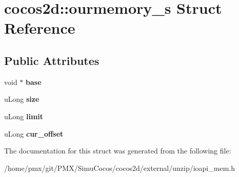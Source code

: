 \hypertarget{structcocos2d_1_1ourmemory__s}{}\section{cocos2d\+:\+:ourmemory\+\_\+s Struct Reference}
\label{structcocos2d_1_1ourmemory__s}
\subsection*{Public Attributes}
\begin{DoxyCompactItemize}
\item 
\mbox{\label{structcocos2d_1_1ourmemory__s_a734476c7b0f0e88657cf8b66eed703e2}} 
void $\ast$ {\bfseries base}
\item 
\mbox{\label{structcocos2d_1_1ourmemory__s_a7e81eabfc3e1fe169d6bd63074f669ca}} 
u\+Long {\bfseries size}
\item 
\mbox{\label{structcocos2d_1_1ourmemory__s_aead9f0a11945a09c08e53de6ea973962}} 
u\+Long {\bfseries limit}
\item 
\mbox{\label{structcocos2d_1_1ourmemory__s_a1f7478ff05fed75458bc3d623200db6d}} 
u\+Long {\bfseries cur\+\_\+offset}
\end{DoxyCompactItemize}


The documentation for this struct was generated from the following file\+:\begin{DoxyCompactItemize}
\item 
/home/pmx/git/\+P\+M\+X/\+Simu\+Cocos/cocos2d/external/unzip/ioapi\+\_\+mem.\+h\end{DoxyCompactItemize}
